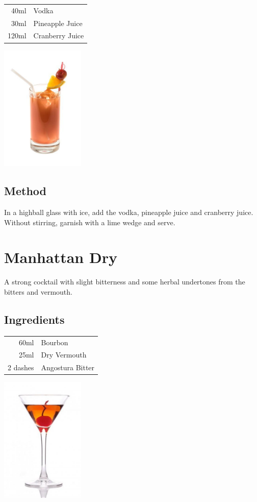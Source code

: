 \documentclass[12pt, letterpaper]{article}
\begin{document}
\begin{multicols}{2}

\begin{tabular} { r | l}
    40ml & Vodka \\
    30ml & Pineapple Juice  \\
    120ml & Cranberry Juice  \\
\end{tabular}

\includegraphics[height=6cm]{baybreeze}

\end{multicols}

\subsection*{Method}
In a highball glass with ice, add the vodka, pineapple juice and cranberry juice.
Without stirring, garnish with a lime wedge and serve.

\pagebreak
\section{Manhattan Dry}
A strong cocktail with slight bitterness and some herbal undertones from the bitters and vermouth.
\subsection*{Ingredients}

\begin{multicols}{2}

\begin{tabular} { r | l}
    60ml & Bourbon \\
    25ml & Dry Vermouth \\
    2 dashes & Angostura Bitter \\
\end{tabular}

\includegraphics[height=6cm]{manhattandry}

\end{multicols}
\end{document}
